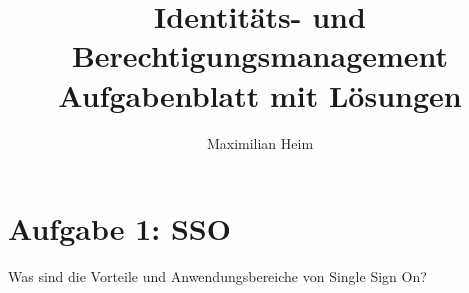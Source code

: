 \documentclass[11pt]{article}
\author{Maximilian Heim}
\title{Identitäts- und Berechtigungsmanagement \\ \large{}Aufgabenblatt mit Lösungen}
\begin{document}
\maketitle
\section*{Aufgabe 1: SSO}
Was sind die Vorteile und Anwendungsbereiche von Single Sign On?
\end{document}
